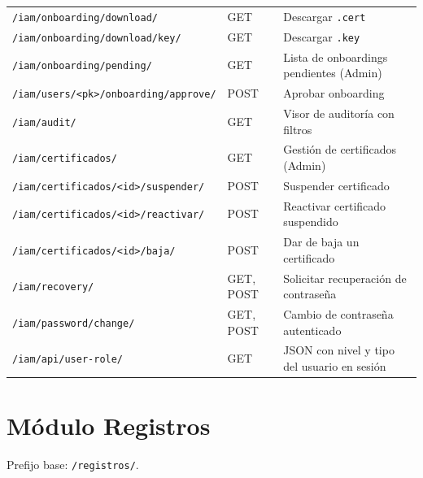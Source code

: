 \documentclass[10pt,letterpaper]{report}
\begin{document}
\begin{longtable}{l l p{4.5cm}}
\texttt{/iam/onboarding/download/} & GET & Descargar \texttt{.cert} \\
\texttt{/iam/onboarding/download/key/} & GET & Descargar \texttt{.key} \\
\texttt{/iam/onboarding/pending/} & GET & Lista de onboardings pendientes (Admin) \\
\texttt{/iam/users/<pk>/onboarding/approve/} & POST & Aprobar onboarding \\
\texttt{/iam/audit/} & GET & Visor de auditoría con filtros \\
\texttt{/iam/certificados/} & GET & Gestión de certificados (Admin) \\
\texttt{/iam/certificados/<id>/suspender/} & POST & Suspender certificado \\
\texttt{/iam/certificados/<id>/reactivar/} & POST & Reactivar certificado suspendido \\
\texttt{/iam/certificados/<id>/baja/} & POST & Dar de baja un certificado \\
\texttt{/iam/recovery/} & GET, POST & Solicitar recuperación de contraseña \\
\texttt{/iam/password/change/} & GET, POST & Cambio de contraseña autenticado \\
\texttt{/iam/api/user-role/} & GET & JSON con nivel y tipo del usuario en sesión \\
\end{longtable}

\section{Módulo Registros}

Prefijo base: \texttt{/registros/}.
\end{document}
